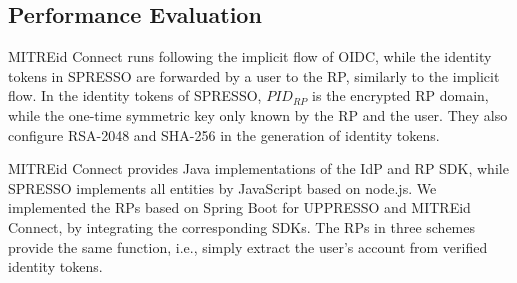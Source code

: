 \subsection{Performance Evaluation}
\label{sec:evaluation}




MITREid Connect runs following the implicit flow of OIDC,
 while the identity tokens in SPRESSO are forwarded by a user to the RP,
    similarly to the implicit flow. %
In the identity tokens of SPRESSO, $PID_{RP}$ is the encrypted RP domain, while the one-time symmetric key only known by the RP and the user.
They also configure RSA-2048 and SHA-256  in the generation of identity tokens.


MITREid Connect provides Java implementations of the IdP and
RP SDK,
 while SPRESSO implements all entities by JavaScript based on node.js.
We implemented the RPs based on Spring Boot for UPPRESSO and MITREid Connect, by integrating the corresponding SDKs.
The RPs in three schemes provide the same function, i.e.,
     simply extract the user's account from verified identity tokens.

